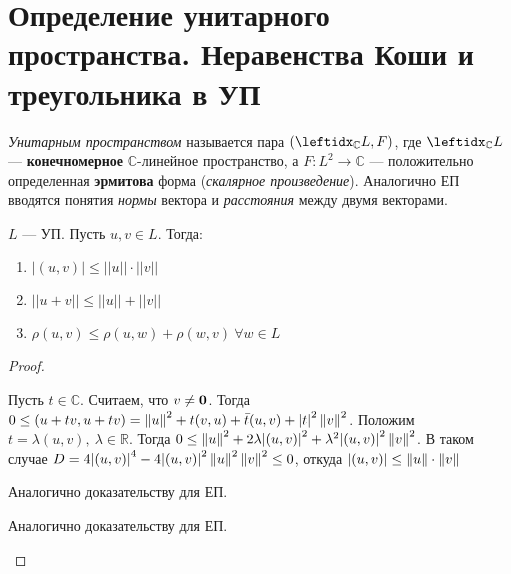 \section{Определение унитарного пространства. Неравенства Коши и треугольника в УП}

\begin{defn}
    \textit{Унитарным пространством} называется пара $(\lsub{\mathbb{C}}{L}, F)$, где $\lsub{\mathbb{C}}{L}$ --- \textbf{конечномерное} $\mathbb{C}$-линейное пространство, а $F \colon L^2 \to \mathbb{C}$ --- положительно определенная \textbf{эрмитова} форма (\textit{скалярное произведение}).
    Аналогично ЕП вводятся понятия \textit{нормы} вектора и \textit{расстояния} между двумя векторами.
\end{defn}

\begin{thm*}
    $L$ --- УП. Пусть $u, v \in L$. Тогда:
    \begin{enumerate}
        \item $|(u, v)| \le ||u|| \cdot ||v||$
        \item $||u + v|| \le ||u|| + ||v||$
        \item $\rho(u, v) \le \rho(u, w) + \rho(w, v)\ \forall w \in L$
    \end{enumerate}
\end{thm*}

\begin{proof}
    \begin{proofpart}
        Пусть $t \in \mathbb{C}$. Считаем, что $v \neq \mathbf{0}$. Тогда $0 \le (u + tv, u + tv) = \left\lVert u\right\rVert^2 + t(v, u) + \bar{t}(u, v) + {|t|}^2\left\lVert v\right\rVert^2$. Положим $t = \lambda(u, v),\ \lambda \in \mathbb{R}$. Тогда $0 \le \left\lVert u\right\rVert^2 + 2\lambda{|(u, v)|}^2 + \lambda^2 {|(u, v)|}^2 \left\lVert v\right\rVert^2$. В таком случае $D = 4{|(u, v)|}^4 - 4{|(u, v)|}^2\left\lVert u\right\rVert^2\left\lVert v\right\rVert^2 \le 0$, откуда $|(u, v)| \le \left\lVert u\right\rVert \cdot \left\lVert v\right\rVert$
    \end{proofpart}
    
    \begin{proofpart}
        Аналогично доказательству для ЕП.
    \end{proofpart}
    
    \begin{proofpart}
        Аналогично доказательству для ЕП.
    \end{proofpart}
\end{proof}
